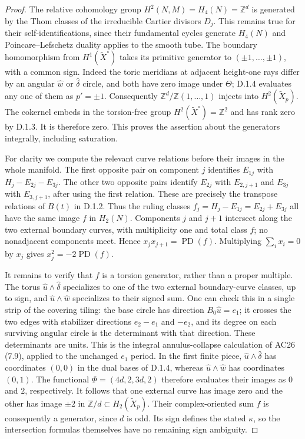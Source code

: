 \begin{proof}
The relative cohomology group $H^2(N,M)=H_4(N)=\mathbb Z^d$ is
generated by the Thom classes of the irreducible Cartier divisors $D_j$.
This remains true for their self-identifications, since their fundamental
cycles generate $H_4(N)$ and Poincare--Lefschetz duality applies to the
smooth tube. The boundary homomorphism from $H^1(\widetilde X^\circ)$
takes its primitive generator to $(\pm1,\ldots,\pm1)$, with a common
sign. Indeed the toric meridians at adjacent height-one rays differ by
an angular $\widehat w$ or $\widehat\delta$ circle, and both have
zero image under $\Theta$; D.1.4 evaluates any one of them as $p'=\pm1$.
Consequently $\mathbb Z^d/\mathbb Z(1,\ldots,1)$ injects into
$H^2(\widetilde X_p)$. The cokernel embeds in the torsion-free group
$H^2(\widetilde X^\circ)=\mathbb Z^2$ and has rank zero by D.1.3.
It is therefore zero. This proves the assertion about the generators
integrally, including saturation.

For clarity we compute the relevant curve relations before their
images in the whole manifold. The first opposite pair on component
$j$ identifies $E_{1j}$ with $H_j-E_{2j}-E_{3j}$. The other two
opposite pairs identify $E_{2j}$ with $E_{2,j+1}$ and $E_{3j}$ with
$E_{3,j+1}$, after using the first relation. These are precisely the
transpose relations of $B(t)$ in D.1.2. Thus the ruling classes
$f_j=H_j-E_{1j}=E_{2j}+E_{3j}$ all have the same image $f$ in
$H_2(N)$. Components $j$ and $j+1$ intersect along the two external
boundary curves, with multiplicity one and total class $f$; no
nonadjacent components meet. Hence $x_jx_{j+1}=\operatorname{PD}(f)$.
Multiplying $\sum_ix_i=0$ by $x_j$ gives $x_j^2=-2\operatorname{PD}(f)$.

It remains to verify that $f$ is a torsion generator, rather than a
proper multiple. The torus $\widehat u\wedge\widehat\delta$ specializes
to one of the two external boundary-curve classes, up to sign, and
$\widehat u\wedge\widehat w$ specializes to their signed sum. One
can check this in a single strip of the covering tiling: the base
circle has direction $B_0\widehat u=e_1$; it crosses the two edges
with stabilizer directions $e_2-e_1$ and $-e_2$, and its degree on
each surviving angular circle is the determinant with that direction.
These determinants are units. This is the integral annulus-collapse
calculation of AC26 (7.9), applied to the unchanged $e_1$ period.
In the first finite piece, $\widehat u\wedge\widehat\delta$ has
coordinates $(0,0)$ in the dual bases of D.1.4, whereas
$\widehat u\wedge\widehat w$ has coordinates $(0,1)$.
The functional $\Phi=(4d,2,3d,2)$ therefore evaluates their images
as $0$ and $2$, respectively. It follows that one external curve
has image zero and the other has image $\pm2$ in
$\mathbb Z/d\subset H_2(\widetilde X_p)$. Their complex-oriented
sum $f$ is consequently a generator, since $d$ is odd. Its sign
defines the stated $\kappa$, so the intersection formulas themselves
have no remaining sign ambiguity.


\end{proof}
